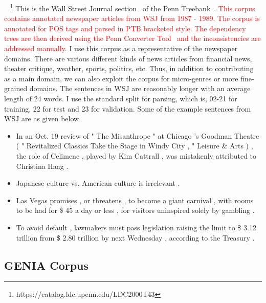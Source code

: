 ~
\footnote{https://catalog.ldc.upenn.edu/LDC2000T43}
This is the Wall Street Journal section~\citep{Marcus:1994:PTA:1075812.1075835} of the Penn Treebank~\citep{santorini:90}. \textcolor{red}{This corpus contains annotated newspaper articles from WSJ from 1987 - 1989. The corpus is annotated for POS tags and parsed in PTB bracketed style. The dependency trees are then derived using the Penn Converter Tool~\citep{johansson2007a} and the inconsistencies are addressed manually}. I use this corpus as a representative of the newspaper domains. There are various different kinds of news articles from financial news, theater critique, weather, sports, politics, etc. Thus, in addition to contributing as a main domain, we can also exploit the corpus for micro-genres or more fine-grained domains. The sentences in WSJ are reasonably longer with an average length of 24 words. I use the standard split for parsing, which is, 02-21 for training, 22 for test and 23 for validation. Some of the example sentences from WSJ are as given below.  
\begin{itemize}
    \item In an Oct. 19 review of " The Misanthrope " at Chicago 's Goodman Theatre ( " Revitalized Classics Take the Stage in Windy City , " Leisure & Arts ) , the role of Celimene , played by Kim Cattrall , was mistakenly attributed to Christina Haag .
    \item Japanese culture vs. American culture is irrelevant .
    \item Las Vegas promises , or threatens , to become a giant carnival , with rooms to be had for \$ 45 a day or less , for visitors uninspired solely by gambling  .
    \item To avoid default , lawmakers must pass legislation raising the limit to \$ 3.12 trillion from \$ 2.80 trillion by next Wednesday , according to the Treasury .
     
\end{itemize}

\subsection{GENIA Corpus}

